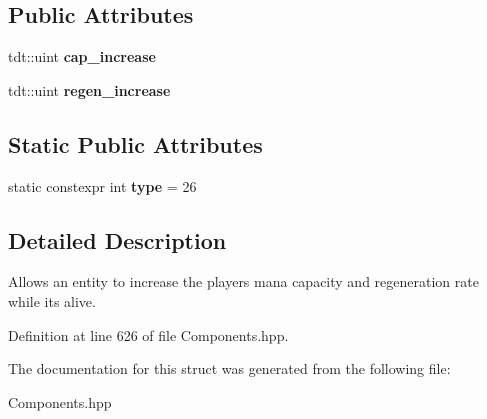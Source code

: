 \subsection*{Public Attributes}
\begin{DoxyCompactItemize}
\item 
tdt\+::uint {\bfseries cap\+\_\+increase}\hypertarget{struct_mana_crystal_component_a7ffd662cde502ebf9f3bc8f4c67a2f1a}{}\label{struct_mana_crystal_component_a7ffd662cde502ebf9f3bc8f4c67a2f1a}

\item 
tdt\+::uint {\bfseries regen\+\_\+increase}\hypertarget{struct_mana_crystal_component_a9449d7a59da42f69ed340d441ea73663}{}\label{struct_mana_crystal_component_a9449d7a59da42f69ed340d441ea73663}

\end{DoxyCompactItemize}
\subsection*{Static Public Attributes}
\begin{DoxyCompactItemize}
\item 
static constexpr int {\bfseries type} = 26\hypertarget{struct_mana_crystal_component_aa5750e2ff5eb023b15cfb96586e891d6}{}\label{struct_mana_crystal_component_aa5750e2ff5eb023b15cfb96586e891d6}

\end{DoxyCompactItemize}


\subsection{Detailed Description}
Allows an entity to increase the player\textquotesingle{}s mana capacity and regeneration rate while it\textquotesingle{}s alive. 

Definition at line 626 of file Components.\+hpp.



The documentation for this struct was generated from the following file\+:\begin{DoxyCompactItemize}
\item 
Components.\+hpp\end{DoxyCompactItemize}
